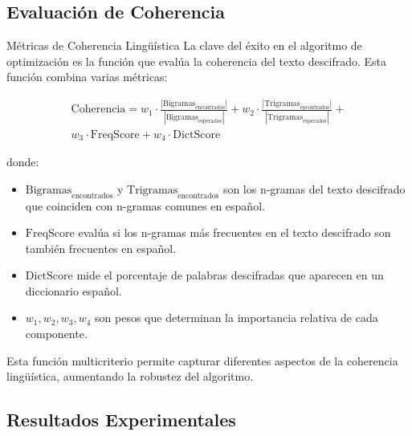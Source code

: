 \subsection{Evaluación de Coherencia}

\begin{cryptoanalysis}{Métricas de Coherencia Lingüística}
La clave del éxito en el algoritmo de optimización es la función que evalúa la coherencia del texto descifrado. Esta función combina varias métricas:

\begin{align}
\text{Coherencia} = w_1 \cdot \frac{|\text{Bigramas}_{\text{encontrados}}|}{|\text{Bigramas}_{\text{esperados}}|} + 
w_2 \cdot \frac{|\text{Trigramas}_{\text{encontrados}}|}{|\text{Trigramas}_{\text{esperados}}|} + \\
w_3 \cdot \text{FreqScore} + 
w_4 \cdot \text{DictScore}
\end{align}

donde:
\begin{itemize}
    \item $\text{Bigramas}_{\text{encontrados}}$ y $\text{Trigramas}_{\text{encontrados}}$ son los n-gramas del texto descifrado que coinciden con n-gramas comunes en español.
    \item $\text{FreqScore}$ evalúa si los n-gramas más frecuentes en el texto descifrado son también frecuentes en español.
    \item $\text{DictScore}$ mide el porcentaje de palabras descifradas que aparecen en un diccionario español.
    \item $w_1, w_2, w_3, w_4$ son pesos que determinan la importancia relativa de cada componente.
\end{itemize}

Esta función multicriterio permite capturar diferentes aspectos de la coherencia lingüística, aumentando la robustez del algoritmo.
\end{cryptoanalysis}

\subsection{Resultados Experimentales}

